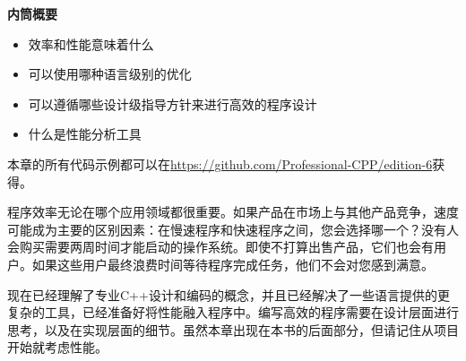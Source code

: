 \noindent
\textbf{内筒概要}

\begin{itemize}
\item
效率和性能意味着什么

\item
可以使用哪种语言级别的优化

\item
可以遵循哪些设计级指导方针来进行高效的程序设计

\item
什么是性能分析工具
\end{itemize}

本章的所有代码示例都可以在\url{https://github.com/Professional-CPP/edition-6}获得。

程序效率无论在哪个应用领域都很重要。如果产品在市场上与其他产品竞争，速度可能成为主要的区别因素：在慢速程序和快速程序之间，您会选择哪一个？没有人会购买需要两周时间才能启动的操作系统。即使不打算出售产品，它们也会有用户。如果这些用户最终浪费时间等待程序完成任务，他们不会对您感到满意。

现在已经理解了专业C++设计和编码的概念，并且已经解决了一些语言提供的更复杂的工具，已经准备好将性能融入程序中。编写高效的程序需要在设计层面进行思考，以及在实现层面的细节。虽然本章出现在本书的后面部分，但请记住从项目开始就考虑性能。
















